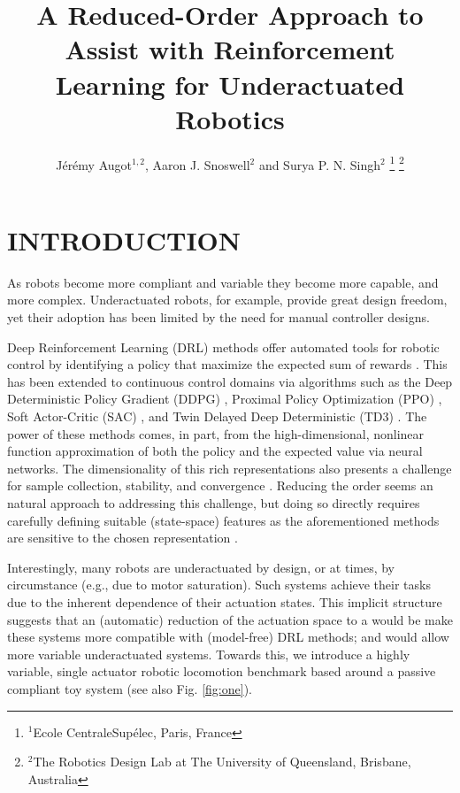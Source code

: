 \documentclass[letterpaper, 10 pt, conference]{ieeeconf}
\title{
    \LARGE \bf%
    A Reduced-Order Approach to Assist with Reinforcement Learning for Underactuated Robotics
}
\author{
    J\'er\'emy Augot$^{1,2}$, Aaron J. Snoswell$^{2}$ and Surya P. N. Singh$^{2}$
    \thanks{
        $^{1}$Ecole CentraleSup\'elec, Paris, France
    }%
    \thanks{
        $^{2}$The Robotics Design Lab at The University of Queensland, Brisbane, Australia
    }%
}
\begin{document}
\maketitle
\thispagestyle{empty}
\pagestyle{empty}

\begin{abstract}

\lipsum[1]

\end{abstract}

\section{INTRODUCTION}

As robots become more compliant and variable they become more capable, and more complex.  Underactuated robots, for example, provide great design freedom, yet their adoption has been limited by the need for manual controller designs.

Deep Reinforcement Learning (DRL) methods offer automated tools for robotic control by identifying a policy that maximize the expected sum of rewards \cite{henderson2018deep}.  This has been extended to continuous control domains via algorithms such as the Deep Deterministic Policy Gradient (DDPG) \cite{DDG}, Proximal Policy Optimization (PPO) \cite{PPO}, Soft Actor-Critic (SAC) \cite{SAC}, and Twin Delayed Deep Deterministic (TD3) \cite{TD3}.  The power of these methods comes, in part, from the high-dimensional, nonlinear function approximation of both the policy and the expected value via neural networks.  The dimensionality of this rich representations also presents a challenge for sample collection, stability, and convergence \cite{Islam2017}.  Reducing the order seems an natural approach to addressing this challenge, but doing so directly requires carefully defining suitable (state-space) features as the aforementioned methods are sensitive to the chosen representation \cite{bhatnagar2009convergent}.  

Interestingly, many robots are underactuated by design, or at times, by circumstance (e.g., due to motor saturation).  Such systems achieve their tasks due to the inherent dependence of their actuation states.  This implicit structure suggests that an (automatic) reduction of the actuation space to a would be make these systems more compatible with (model-free) DRL methods; and would allow more variable underactuated systems.  Towards this, we introduce a highly variable, single actuator robotic locomotion benchmark based around a passive compliant toy system (see also Fig. \ref{fig:one}).
\end{document}
